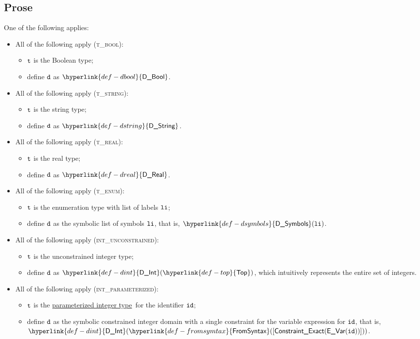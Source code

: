 \documentclass{book}
\newcommand\parameterizedintegertype[0]{\hyperlink{def-parameterizedintegertype}{parameterized integer type}}
\newcommand\DBool[0]{\hyperlink{def-dbool}{\textsf{D\_Bool}}}
\newcommand\DString[0]{\hyperlink{def-dstring}{\textsf{D\_String}}}
\newcommand\DReal[0]{\hyperlink{def-dreal}{\textsf{D\_Real}}}
\newcommand\DSymbols[0]{\hyperlink{def-dsymbols}{\textsf{D\_Symbols}}}
\newcommand\DInt[0]{\hyperlink{def-dint}{\textsf{D\_Int}}}
\newcommand\Top[0]{\hyperlink{def-top}{\textsf{Top}}}
\newcommand\FromSyntax[0]{\hyperlink{def-fromsymtax}{\textsf{FromSyntax}}}
\begin{document}
\subsection{Prose}
One of the following applies:
\begin{itemize}
  \item All of the following apply (\textsc{t\_bool}):
  \begin{itemize}
    \item $\texttt{t}$ is the Boolean type;
    \item define $\texttt{d}$ as $\DBool$.
  \end{itemize}

  \item All of the following apply (\textsc{t\_string}):
  \begin{itemize}
    \item $\texttt{t}$ is the string type;
    \item define $\texttt{d}$ as $\DString$.
  \end{itemize}

  \item All of the following apply (\textsc{t\_real}):
  \begin{itemize}
    \item $\texttt{t}$ is the real type;
    \item define $\texttt{d}$ as $\DReal$.
  \end{itemize}

  \item All of the following apply (\textsc{t\_enum}):
  \begin{itemize}
    \item $\texttt{t}$ is the enumeration type with list of labels $\texttt{li}$;
    \item define $\texttt{d}$ as the symbolic list of symbols $\texttt{li}$, that is, $\DSymbols(\vli)$.
  \end{itemize}

  \item All of the following apply (\textsc{int\_unconstrained}):
  \begin{itemize}
    \item $\texttt{t}$ is the unconstrained integer type;
    \item define $\texttt{d}$ as $\DInt(\Top)$, which intuitively represents the entire set of integers.
  \end{itemize}

  \item All of the following apply (\textsc{int\_parameterized}):
  \begin{itemize}
    \item $\texttt{t}$ is the \parameterizedintegertype\ for the identifier $\texttt{id}$;
    \item define $\texttt{d}$ as the symbolic constrained integer domain with a single constraint for the variable expression for $\texttt{id}$,
          that is, \\ $\DInt(\FromSyntax([\ConstraintExact(\EVar(\id))]))$.
  \end{itemize}


\end{itemize}
\end{document}
